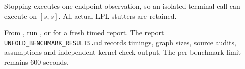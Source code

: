 Stopping executes one endpoint observation, so an isolated terminal call
can execute on $[s,s]$. All actual LPL stutters are retained.

From , run , or
 for a fresh
timed report. The report
\href{run:../UNFOLD_BENCHMARK_RESULTS.md}{\nolinkurl{UNFOLD_BENCHMARK_RESULTS.md}}
records timings, graph sizes, source audits, assumptions and independent
kernel-check output. The per-benchmark limit remains 600 seconds.
